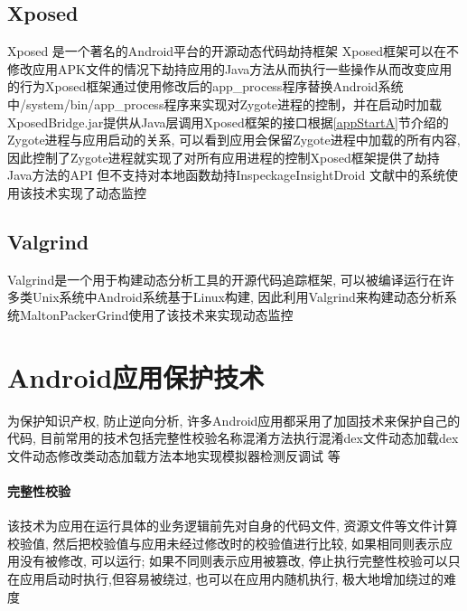 \subsection{Xposed}
 Xposed 是一个著名的Android平台的开源动态代码劫持框架\juhao
 Xposed框架可以在不修改应用APK文件的情况下劫持应用的Java方法从而执行一些操作从而改变应用的行为\juhao Xposed框架通过使用修改后的app\_process程序替换Android系统中/system/bin/app\_process程序来实现对Zygote进程的控制，并在启动时加载XposedBridge.jar提供从Java层调用Xposed框架的接口\juhao 根据\ref{appStartA}节介绍的Zygote进程与应用启动的关系, 可以看到应用会保留Zygote进程中加载的所有内容, 因此控制了Zygote进程就实现了对所有应用进程的控制\juhao Xposed框架提供了劫持Java方法的API
但不支持对本地函数劫持\juhao  Inspeckage\dunhao InsightDroid 文献\cite{chinese2}中的系统使用该技术实现了动态监控\juhao 

\subsection{Valgrind}
Valgrind是一个用于构建动态分析工具的开源代码追踪框架, 可以被编译运行在许多类Unix系统中\juhao Android系统基于Linux构建, 因此利用Valgrind来构建动态分析系统\juhao Malton\dunhao PackerGrind使用了该技术来实现动态监控\juhao 

\section{Android应用保护技术}
为保护知识产权, 防止逆向分析, 许多Android应用都采用了加固技术来保护自己的代码, 目前常用的技术包括完整性校验\dunhao 名称混淆\dunhao 方法执行混淆\dunhao dex文件动态加载\dunhao dex文件动态修改\dunhao 类动态加载\dunhao 方法本地实现\dunhao 模拟器检测\dunhao 反调试 等\juhao

\paragraph*{完整性校验}
该技术为应用在运行具体的业务逻辑前先对自身的代码文件, 资源文件等文件计算校验值, 然后把校验值与应用未经过修改时的校验值进行比较, 如果相同则表示应用没有被修改, 可以运行; 如果不同则表示应用被篡改, 停止执行\juhao 完整性校验可以只在应用启动时执行,但容易被绕过, 也可以在应用内随机执行, 极大地增加绕过的难度\juhao 

